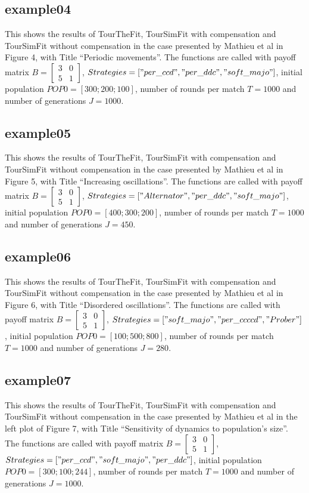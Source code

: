 \subsection{example04}
This shows the results of TourTheFit, TourSimFit with compensation and TourSimFit without compensation in the case presented by Mathieu et al in Figure 4, with Title ``Periodic movements''. The functions are called with payoff matrix $B = \begin{bmatrix} 3 & 0 \\ 5 & 1 \end{bmatrix}$, $Strategies = ["per\_ccd", "per\_ddc", "soft\_majo"]$, initial population $POP0 = [300; 200; 100]$, number of rounds per match $T = 1000$ and number of generations $J = 1000$.

\subsection{example05}
This shows the results of TourTheFit, TourSimFit with compensation and TourSimFit without compensation in the case presented by Mathieu et al in Figure 5, with Title ``Increasing oscillations''. The functions are called with payoff matrix $B = \begin{bmatrix} 3 & 0 \\ 5 & 1 \end{bmatrix}$, $Strategies = ["Alternator", "per\_ddc", "soft\_majo"]$, initial population $POP0 = [400; 300; 200]$, number of rounds per match $T = 1000$ and number of generations $J = 450$.

\subsection{example06}
This shows the results of TourTheFit, TourSimFit with compensation and TourSimFit without compensation in the case presented by Mathieu et al in Figure 6, with Title ``Disordered oscillations''. The functions are called with payoff matrix $B = \begin{bmatrix} 3 & 0 \\ 5 & 1 \end{bmatrix}$, $Strategies = ["soft\_majo", "per\_ccccd", "Prober"]$, initial population $POP0 = [100; 500; 800]$, number of rounds per match $T = 1000$ and number of generations $J = 280$.

\subsection{example07}
This shows the results of TourTheFit, TourSimFit with compensation and TourSimFit without compensation in the case presented by Mathieu et al in the left plot of Figure 7, with Title ``Sensitivity of dynamics to population's size''. The functions are called with payoff matrix $B = \begin{bmatrix} 3 & 0 \\ 5 & 1 \end{bmatrix}$, $Strategies = ["per\_ccd", "soft\_majo", "per\_ddc"]$, initial population $POP0 = [300; 100; 244]$, number of rounds per match $T = 1000$ and number of generations $J = 1000$.

